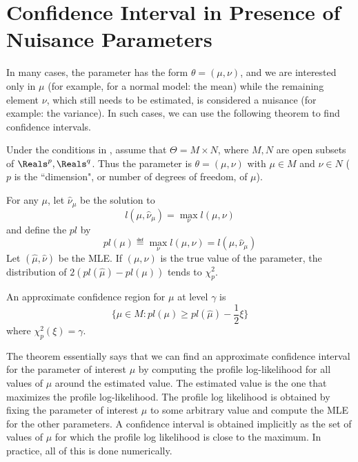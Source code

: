  \section{Confidence Interval in Presence of Nuisance Parameters}
 In many cases, the parameter has the form $\theta=(\mu, \nu)$, and we are interested only in $\mu$ (for example, for a
 normal model: the mean) while the remaining element $\nu$, which still needs to be estimated, is
 considered a nuisance (for example: the variance). In such cases, we can use the following
 theorem to find confidence intervals.
 \begin{shadethm}
 Under the conditions in , assume that $\Theta = M \times
 N$, where $M, N$ are open subsets of $\Reals^p, \Reals^q$. Thus the parameter is $\theta=(\mu, \nu)$
 with $\mu \in M$ and $\nu \in N$ ($p$ is the ``dimension", or number of degrees of freedom, of
 $\mu$).

 For any $\mu$, let $\hat{\nu}_{\mu}$ be the
 solution to
 $$ l(\mu,\hat{\nu}_{\mu})=\max_{\nu}l(\mu, \nu)$$
  and define the  $pl$ by
 $$
 pl(\mu)\eqdef\max_{\nu} l(\mu,\nu)= l(\mu, \hat{\nu}_{\mu})$$
Let $(\hat{\mu},\hat{\nu})$ be the MLE. If $(\mu,\nu)$ is the true
value of the parameter, the distribution of
$2\left(pl(\hat{\mu})-pl(\mu)\right)$ tends to $\chi^2_p$.

An approximate confidence region for $\mu$ at level $\gamma$ is
$$
\{\mu \in M: pl(\mu) \geq pl(\hat{\mu})-\frac{1}{2}\xi\}
$$
where $\chi^2_p(\xi)=\gamma$.
\end{shadethm} The theorem essentially says that we can find an approximate confidence
interval for the parameter of interest $\mu$ by computing the
profile log-likelihood for all values of $\mu$ around the
estimated value. The estimated value is the one that maximizes the
profile log-likelihood. The profile log likelihood is obtained by
fixing the parameter of interest $\mu$ to some arbitrary value and
compute the MLE for the other parameters. A confidence interval is
obtained implicitly as the set of values of $\mu$ for which the
profile log likelihood is close to the maximum. In practice, all
of this is done numerically.

